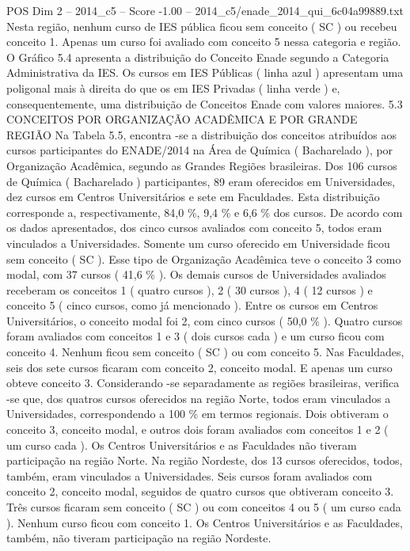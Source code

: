 \begin{textsample}{POS Dim 2 – 2014\_c5 – Score -1.00 – 2014\_c5/enade\_2014\_qui\_6c04a99889.txt}
Nesta região, nenhum curso de IES pública ficou sem conceito ( SC ) ou recebeu conceito 1.
Apenas um curso foi avaliado com conceito 5 nessa categoria e região.
O Gráfico 5.4 apresenta a distribuição do Conceito Enade segundo a Categoria Administrativa da IES.
Os cursos em IES Públicas ( linha azul ) apresentam uma poligonal mais à direita do que os em IES Privadas ( linha verde ) e, consequentemente, uma distribuição de Conceitos Enade com valores maiores. 5.3 CONCEITOS POR ORGANIZAÇÃO ACADÊMICA E POR GRANDE REGIÃO Na Tabela 5.5, encontra -se a distribuição dos conceitos atribuídos aos cursos participantes do ENADE/2014 na Área de Química ( Bacharelado ), por Organização Acadêmica, segundo as Grandes Regiões brasileiras.
Dos 106 cursos de Química ( Bacharelado ) participantes, 89 eram oferecidos em Universidades, dez cursos em Centros Universitários e sete em Faculdades.
Esta distribuição corresponde a, respectivamente, 84,0 \%, 9,4 \% e 6,6 \% dos cursos.
De acordo com os dados apresentados, dos cinco cursos avaliados com conceito 5, todos eram vinculados a Universidades.
Somente um curso oferecido em Universidade ficou sem conceito ( SC ).
Esse tipo de Organização Acadêmica teve o conceito 3 como modal, com 37 cursos ( 41,6 \% ).
Os demais cursos de Universidades avaliados receberam os conceitos 1 ( quatro cursos ), 2 ( 30 cursos ), 4 ( 12 cursos ) e conceito 5 ( cinco cursos, como já mencionado ).
Entre os cursos em Centros Universitários, o conceito modal foi 2, com cinco cursos ( 50,0 \% ).
Quatro cursos foram avaliados com conceitos 1 e 3 ( dois cursos cada ) e um curso ficou com conceito 4.
Nenhum ficou sem conceito ( SC ) ou com conceito 5.
Nas Faculdades, seis dos sete cursos ficaram com conceito 2, conceito modal.
E apenas um curso obteve conceito 3.
Considerando -se separadamente as regiões brasileiras, verifica -se que, dos quatros cursos oferecidos na região Norte, todos eram vinculados a Universidades, correspondendo a 100 \% em termos regionais.
Dois obtiveram o conceito 3, conceito modal, e outros dois foram avaliados com conceitos 1 e 2 ( um curso cada ).
Os Centros Universitários e as Faculdades não tiveram participação na região Norte.
Na região Nordeste, dos 13 cursos oferecidos, todos, também, eram vinculados a Universidades.
Seis cursos foram avaliados com conceito 2, conceito modal, seguidos de quatro cursos que obtiveram conceito 3.
Três cursos ficaram sem conceito ( SC ) ou com conceitos 4 ou 5 ( um curso cada ).
Nenhum curso ficou com conceito 1.
Os Centros Universitários e as Faculdades, também, não tiveram participação na região Nordeste.

\end{textsample}
